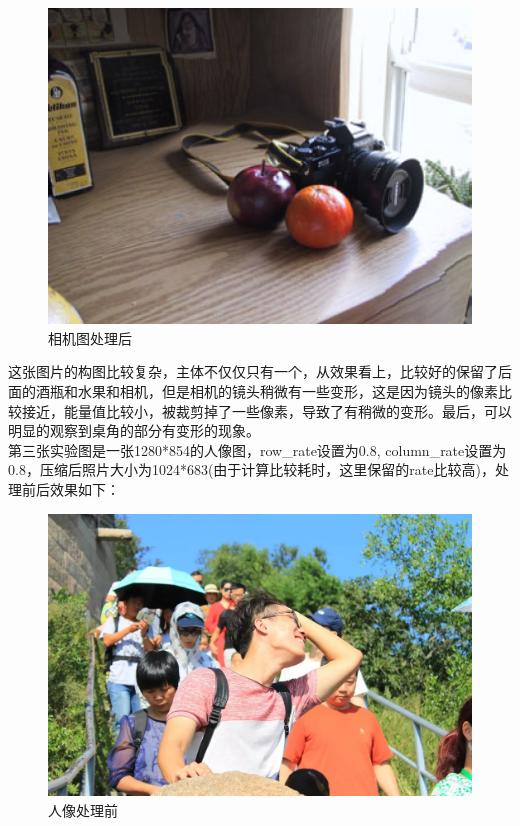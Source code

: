 \documentclass[UTF8]{ctexart}
\begin{document}
\begin{figure}[H]
    \centering
    \includegraphics[width=1\textwidth]{img/output-2.png}
    \caption{相机图处理后}
    \label{output-2}
\end{figure}

这张图片的构图比较复杂，主体不仅仅只有一个，从效果看上，比较好的保留了后面的酒瓶和水果和相机，但是相机的镜头稍微有一些变形，这是因为镜头的像素比较接近，能量值比较小，被裁剪掉了一些像素，导致了有稍微的变形。最后，可以明显的观察到桌角的部分有变形的现象。\\

第三张实验图是一张1280*854的人像图，row\_rate设置为0.8, column\_rate设置为0.8，压缩后照片大小为1024*683(由于计算比较耗时，这里保留的rate比较高)，处理前后效果如下：
\begin{figure}[H]
    \centering
    \includegraphics[width=1\textwidth]{img/input-3.jpg}
    \caption{人像处理前}
    \label{input-3}
\end{figure}
\end{document}
